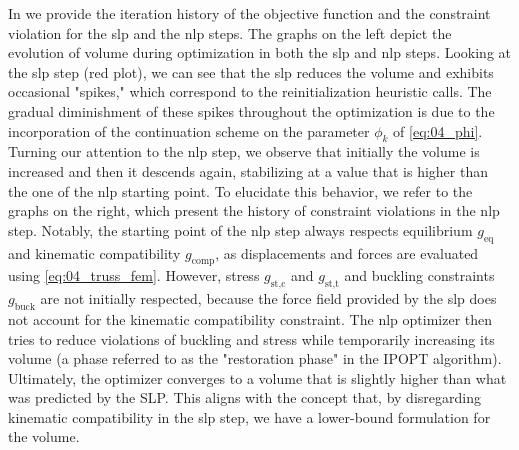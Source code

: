 In  we provide the iteration history of the objective function and the constraint violation for the \gls{slp} and the \gls{nlp} steps. The graphs on the left depict the evolution of volume during optimization in both the \gls{slp} and \gls{nlp} steps. Looking at the \gls{slp} step (red plot), we can see that the \gls{slp} reduces the volume and exhibits occasional "spikes," which correspond to the reinitialization heuristic calls. The gradual diminishment of these spikes throughout the optimization is due to the incorporation of the continuation scheme on the parameter $\phi_k$ of \eqref{eq:04_phi}. Turning our attention to the \gls{nlp} step, we observe that initially the volume is increased and then it descends again, stabilizing at a value that is higher than the one of the \gls{nlp} starting point. To elucidate this behavior, we refer to the graphs on the right, which present the history of constraint violations in the \gls{nlp} step. Notably, the starting point of the \gls{nlp} step always respects equilibrium $g_\text{eq}$ and kinematic compatibility $g_\text{comp}$, as displacements and forces are evaluated using \eqref{eq:04_truss_fem}. However, stress $g_\text{st,c}$ and $g_\text{st,t}$ and buckling constraints $g_\text{buck}$ are not initially respected, because the force field provided by the \gls{slp} does not account for the kinematic compatibility constraint. The \gls{nlp} optimizer then tries to reduce violations of buckling and stress while temporarily increasing its volume (a phase referred to as the "restoration phase" in the IPOPT algorithm). Ultimately, the optimizer converges to a volume that is slightly higher than what was predicted by the SLP. This aligns with the concept that, by disregarding kinematic compatibility in the \gls{slp} step, we have a lower-bound formulation for the volume.

